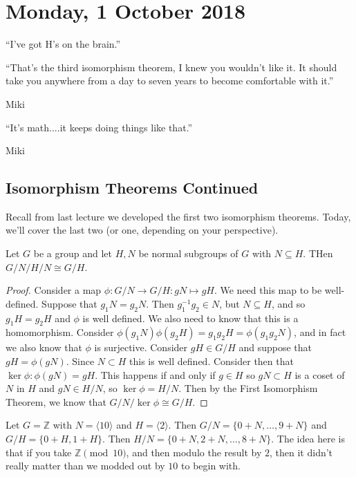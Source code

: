 \section{Monday, 1 October 2018}

\epigraph{``I've got H's on the brain.''}{}

\epigraph{``That's the third isomorphism theorem, I knew you wouldn't like it. It should take you anywhere from a day to seven years to become comfortable with it.''}{Miki}

\epigraph{``It's math....it keeps doing things like that.''}{Miki}

\subsection{Isomorphism Theorems Continued}

Recall from last lecture we developed the first two isomorphism theorems. Today, we'll cover the last two (or one, depending on your perspective).

\begin{theorem}
Let $G$ be a group and let $H,N$ be normal subgroups of $G$ with $N \subseteq H$. THen $G/N \big/ H/N \cong G/H$.
\end{theorem}

\begin{proof}
Consider a map $\phi : G/N \to G/H : gN \mapsto gH$. We need this map to be well-defined. Suppose that $g_1N = g_2N$. Then $g_1^{-1}g_2 \in N$, but $N \subseteq H$, and so $g_1H = g_2H$ and $\phi$ is well defined. We also need to know that this is a homomorphism. Consider $\phi(g_1N)\phi(g_2H) = g_1g_2H = \phi(g_1g_2N)$, and in fact we also know that $\phi$ is surjective. Consider $gH \in G/H$ and suppose that $gH = \phi(gN)$. Since $N \subset H$ this is well defined. Consider then that $\ker \phi : \phi(gN) = gH$. This happens if and only if $g \in H$ so $gN \subset H$ is a coset of $N$ in $H$ and $gN \in H/N$, so $\ker\phi = H/N$. Then by the First Isomorphism Theorem, we know that $G/N \big/ \ker\phi \cong G/H$.
\end{proof}

\begin{example}
Let $G = \mathbb{Z}$ with $N = \langle 10 \rangle$ and $H = \langle 2 \rangle$. Then $G/N = \{0 + N,\dotsc,9+N\}$ and $G/H = \{0 + H, 1 + H\}$. Then $H / N = \{0 + N, 2 + N,\dotsc,8 + N\}$. The idea here is that if you take $\mathbb{Z} \pmod{10}$, and then modulo the result by $2$, then it didn't really matter than we modded out by $10$ to begin with.
\end{example}

